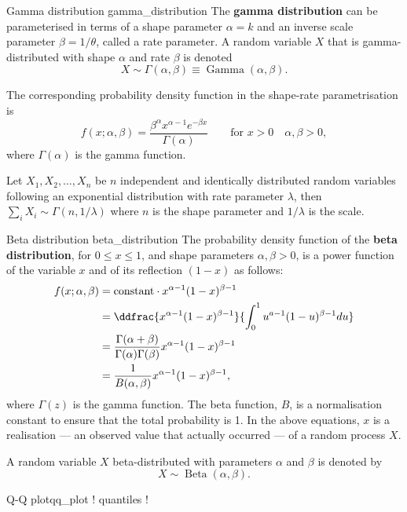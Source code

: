 \begin{definition}{Gamma distribution \cite{wikipedia_gamma_distribution}}{gamma_distribution}
	The \textbf{gamma distribution} can be parameterised in terms of a shape parameter $\alpha = k$ and an inverse scale parameter $\beta = 1/\theta$, called a rate parameter. A random variable $X$ that is gamma-distributed with shape $\alpha$ and rate $\beta$ is denoted
	$$ X \sim \Gamma(\alpha, \beta) \equiv \operatorname{Gamma}(\alpha, \beta) . $$
	
	The corresponding probability density function in the shape-rate parametrisation is
	$$
		f(x; \alpha, \beta) = 
		\frac{\beta^\alpha x^{\alpha - 1} e^{-\beta x}}{\Gamma(\alpha)}
		\qquad \text{for } x > 0 \quad \alpha, \beta > 0,
	$$
	where $\Gamma(\alpha)$ is the gamma function.
\end{definition}

Let $X_1, X_2, \ldots, X_n$ be $n$ independent and identically distributed random variables following an exponential distribution with rate parameter $\lambda$, then $\sum_i X_i \sim \Gamma(n, 1/\lambda)$ where $n$ is the shape parameter and $1/\lambda$ is the scale.

\begin{definition}{Beta distribution \cite{wikipedia_beta_distribution}}{beta_distribution}
	The probability density function of the \textbf{beta distribution}, for $0 \leq x \leq 1$, and shape parameters $\alpha, \beta > 0$, is a power function of the variable $x$ and of its reflection $(1 - x)$ as follows:
	\begin{align*}
		f(x; \alpha, \beta)
		&= \text{constant} \cdot x^{\alpha - 1} (1 - x)^{\beta - 1} \\
		&= \ddfrac{x^{\alpha - 1} (1 - x)^{\beta - 1}}
			{\int_0^1 u^{a - 1} (1 - u)^{\beta - 1} du} \\
		&= \frac{\Gamma(\alpha + \beta)}{\Gamma(\alpha) \Gamma(\beta)}
			x^{\alpha - 1} (1 - x)^{\beta - 1} \\
		&= \frac{1}{B(\alpha, \beta)}
			x^{\alpha - 1} (1 - x)^{\beta - 1} ,
	\end{align*}
	where $\Gamma(z)$ is the gamma function. The beta function, $B$, is a normalisation constant to ensure that the total probability is 1. In the above equations, $x$ is a realisation --- an observed value that actually occurred --- of a random process $X$.

	A random variable $X$ beta-distributed with parameters $\alpha$ and $\beta$ is denoted by
	$$ X \sim \operatorname{Beta}(\alpha, \beta) . $$
\end{definition}

\begin{definition}{Q-Q plot}{qq_plot}
	! quantiles !
\end{definition}